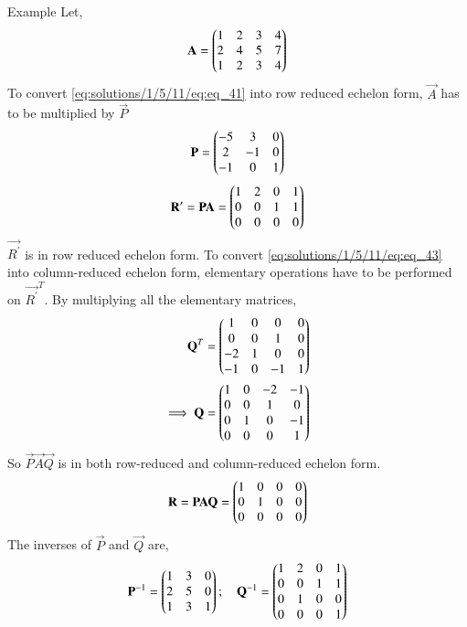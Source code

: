 {Example}
Let,
\begin{align} \label{eq:solutions/1/5/11/eq:eq_41}
    \mathbf{A} = \begin{pmatrix}1 & 2 & 3 & 4 \\ 2 & 4 & 5 & 7 \\ 1 & 2 & 3 & 4\end{pmatrix}
\end{align}
To convert \eqref{eq:solutions/1/5/11/eq:eq_41} into row reduced echelon form, $\vec{A}$ has to be multiplied by $\vec{P}$
\begin{align}
    \mathbf{P} = \begin{pmatrix}-5 & 3 & 0 \\ 2 & -1 & 0 \\ -1 & 0 & 1\end{pmatrix} \label{eq:solutions/1/5/11/eq:eq_42}
\end{align}
\begin{align}
    \mathbf{R^{\prime}} = \mathbf{P}\mathbf{A} = \begin{pmatrix}1 & 2 & 0 & 1\\ 0 & 0 & 1 & 1 \\ 0 & 0 & 0 & 0\end{pmatrix} \label{eq:solutions/1/5/11/eq:eq_43}
\end{align}
$\vec{R^{\prime}}$ is in row reduced echelon form. To convert \eqref{eq:solutions/1/5/11/eq:eq_43} into column-reduced echelon form, elementary operations have to be performed on ${\vec{R^{\prime}}}^T$. 
By multiplying all the elementary matrices,
\begin{align} 
    \mathbf{Q}^T = \begin{pmatrix}1 & 0 & 0 & 0 \\ 0 & 0 & 1 & 0 \\ -2 & 1 & 0 & 0 \\ -1 & 0 & -1 & 1\end{pmatrix} \label{eq:solutions/1/5/11/eq:eq_45} \\ 
    \implies \mathbf{Q} = \begin{pmatrix}1 & 0 & -2 & -1 \\ 0 & 0 & 1 & 0 \\ 0 & 1 & 0 & -1 \\ 0 & 0 & 0 & 1\end{pmatrix} \label{eq:solutions/1/5/11/eq:eq_46}
\end{align}
So $\vec{P}\vec{A}\vec{Q}$ is in both row-reduced and column-reduced echelon form.
\begin{align} \label{eq:solutions/1/5/11/eq:eq_47}
    \mathbf{R} = \mathbf{P}\mathbf{A}\mathbf{Q} = \begin{pmatrix}1 & 0 & 0 & 0 \\ 0 & 1 & 0 & 0 \\ 0 & 0 & 0 & 0\end{pmatrix}
\end{align}
The inverses of $\vec{P}$ and $\vec{Q}$ are,
\begin{align} \label{eq:solutions/1/5/11/eq:eq_48}
    \mathbf{P}^{-1} = \begin{pmatrix}1 & 3 & 0 \\ 2 & 5 & 0 \\ 1 & 3 & 1\end{pmatrix}; \quad 
    \mathbf{Q}^{-1} = \begin{pmatrix}1 & 2 & 0 & 1 \\ 0 & 0 & 1 & 1 \\ 0 & 1 & 0 & 0 \\ 0 & 0 & 0 & 1\end{pmatrix}
\end{align}
